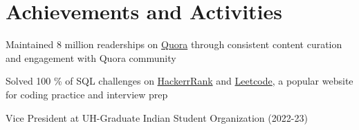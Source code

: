 \documentclass[letterpaper,10.8pt]{article}
\begin{document}
\section{Achievements and Activities}
 \begin{description}[font=$\bullet$]
 \item {Maintained 8 million readerships on \href{https://www.quora.com/profile/Dinesh-Narlakanti}{Quora} through consistent content curation and engagement with Quora community} 
 \item {Solved 100 \% of SQL challenges on \href{https://github.com/DineshNarlakanti/SQL-Hackerrank}{HackerrRank} and \href{https://github.com/DineshNarlakanti/SQL-Leetcode}{Leetcode}, a popular website for coding practice and interview prep\\}
 \item {Vice President at UH-Graduate Indian Student Organization (2022-23)}

\end{description}
\end{document}
